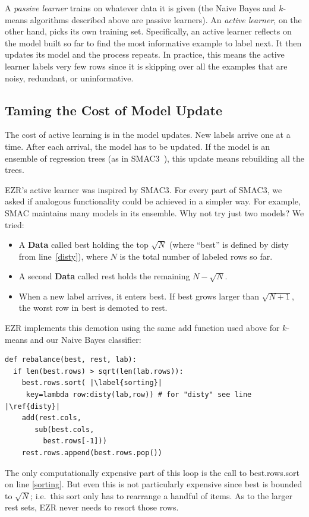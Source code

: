 \documentclass[AMA,STIX2COL]{WileyNJDv5}
\newcommand{\cls}[1]{%
  \setlength{\fboxsep}{1.5pt}%
  \colorbox{clsbg}{\sffamily\bfseries{#1}}%
}
\begin{document}
 A {\em passive learner} trains on whatever data it is given (the Naive Bayes and
 $k$-means algorithms described above are passive learners). An {\em active
learner}, on the other hand,  picks its own training set. Specifically, an active learner reflects on the
model built so far to find the  most informative    example to label next. 
It then updates its model and the process repeats. In practice,
this means the active learner labels very few rows since it is 
skipping over all the  examples that are noisy, redundant, or
uninformative.  

\subsection{Taming the Cost of Model Update}

The cost of active learning is in the model updates. New labels arrive
one at a time. After each arrival, the model has to be updated. If
the model is an ensemble of regression trees (as in
SMAC3~\cite{hutter2011sequential}), this update means rebuilding all the trees.

EZR's active learner 
was inspired by SMAC3. For every part of SMAC3, we asked if   analogous
functionality could be achieved in a simpler way.
For example,   SMAC maintains many models in its ensemble.
Why not try just two models?  We tried:
\begin{itemize}
\item A \cls{Data} called \textsf{best} holding the top $\sqrt{N}$
(where ``best'' is defined by \textsf{disty} from line~\ref{disty}), where $N$ is the total number of
labeled rows so far.
\item A second \cls{Data} called \textsf{rest} holds the
remaining $N - \sqrt{N}$.
\item When a new label arrives, it enters \textsf{best}. If
  \textsf{best} grows larger than  $\sqrt{N+1}$, the worst row in
\textsf{best} is demoted to \textsf{rest}.
\end{itemize}
EZR implements this demotion using the same \textsf{add} function used
above for $k$-means and our Naive Bayes classifier:
\begin{verbatim}
def rebalance(best, rest, lab): 
  if len(best.rows) > sqrt(len(lab.rows)):
    best.rows.sort( |\label{sorting}|
     key=lambda row:disty(lab,row)) # for "disty" see line |\ref{disty}|
    add(rest.cols, 
       sub(best.cols,
         best.rows[-1]))
    rest.rows.append(best.rows.pop())
\end{verbatim}
The only computationally expensive part of this loop
is the call to \textsf{best.rows.sort} on line \ref{sorting}. But even this
is not particularly expensive since \textsf{best} is bounded to $\sqrt{N}$;
i.e.\ 
this sort only has to rearrange a handful of items.  As to the larger \textsf{rest} sets,  EZR never needs to resort those rows.
\end{document}
